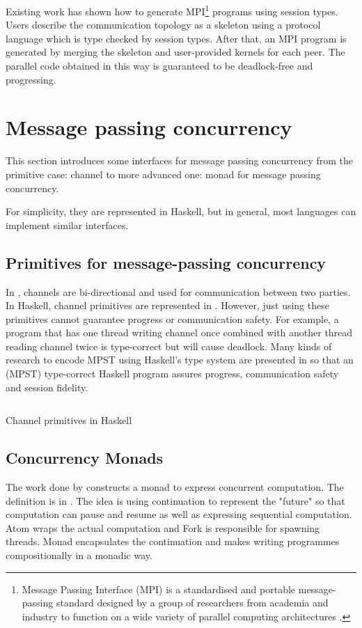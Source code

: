 Existing work\cite{ngSafeMPICode} has shown how to generate MPI\footnote{Message Passing Interface (MPI) is a standardised and portable message-passing standard designed by a group of researchers from academia and industry to function on a wide variety of parallel computing architectures \cite{MessagePassingInterface2018}.} programs using session types. Users describe the communication topology as a skeleton using a protocol language which is type checked by session types. After that, an MPI program is generated by merging the skeleton and user-provided kernels for each peer. The parallel code obtained in this way is guaranteed to be deadlock-free and progressing. 

\section{Message passing concurrency} \label{b:mo}
This section introduces some interfaces for message passing concurrency from the primitive case: channel to more advanced one: monad for message passing concurrency.

For simplicity, they are represented in Haskell, but in general, most languages can implement similar interfaces. 
\subsection{Primitives for message-passing concurrency} \label{b:mo:mpc}
In , channels are bi-directional and used for communication between two parties. In Haskell, channel primitives are represented in . However, just using these primitives cannot guarantee progress or communication safety. For example, a program that has one thread writing channel once combined with another thread reading channel twice is type-correct but will cause deadlock. Many kinds of research to encode MPST using Haskell's type system are presented in \cite{orchardSessionTypesLinearity} so that an (MPST) type-correct Haskell program assures progress, communication safety and session fidelity.
\begin{listing}[ht]
  \inputminted{haskell}{background/mo-chan.hs}
  \caption{Channel primitives in Haskell}
  \label{b:mo:c1}
\end{listing}
\subsection{Concurrency Monads}
The work done by \cite{claessenFunctionalPearlsPoor1999} constructs a monad to express concurrent computation. The definition is in . The idea is using continuation to represent the "future" so that computation can pause and resume as well as expressing sequential computation. Atom wraps the actual computation and Fork is responsible for spawning threads. Monad encapsulates the continuation and makes writing programmes compositionally in a monadic way.

